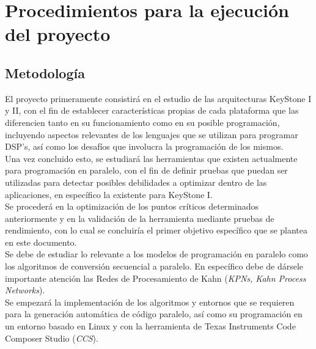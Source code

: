 
\chapter{Procedimientos para la ejecución del proyecto}
\label{ch:Procedimientos_para_la_ejecucion_del_proyecto}

\section{Metodología}

El proyecto primeramente consistirá en el estudio de las arquitecturas
KeyStone I y II, con el fin de establecer características propias de cada
plataforma que las diferencien tanto en su funcionamiento como en su posible
programación, incluyendo aspectos relevantes de los lenguajes que se utilizan
para programar DSP's, así como los desafíos que involucra la programación de los mismos.\\

Una vez concluido esto, se estudiará las herramientas que existen actualmente para programación en paralelo, 
con el fin de definir pruebas que puedan ser utilizadas para detectar posibles debilidades a optimizar 
dentro de las aplicaciones, en específico la existente para \newline KeyStone I.\\

Se procederá en la optimización de los puntos críticos determinados anteriormente 
y en la validación de la herramienta mediante pruebas de rendimiento, con lo cual se concluiría 
el primer objetivo específico que se plantea en este documento.\\

Se debe de estudiar lo relevante a los modelos de programación en paralelo como los algoritmos
de conversión secuencial a paralelo. En específico debe de dársele 
importante atención las Redes de Procesamiento de Kahn (\textit{KPNs, Kahn Process Networks}).\\

Se empezará la implementación de los algoritmos y entornos que se requieren para la generación automática
de código paralelo, así como su programación en un entorno
basado en Linux y con la herramienta de Texas Instruments Code Composer Studio (\textit{CCS}).\\

